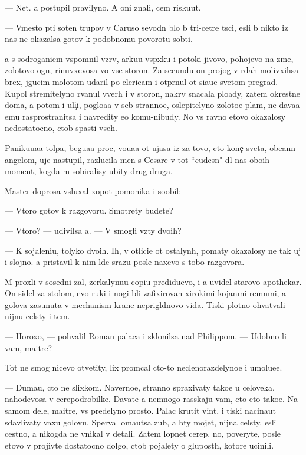 \documentclass[10pt]{book}
\begin{document}
— Net. {\Y}a postupil pravilyno. A oni znali, cem risku{\y}ut.

— Vmesto p{\ia}ti soten trupov v Caruso sevodn{\ia} b{\yi}lo b{\yi} tri-cet{\yi}re t{\yi}s{\ia}ci, {\y}esli b{\yi} nikto iz nas ne okazalsa gotov k podobnomu povorotu sob{\yi}ti{\y}.

{\Y}a s sodrogani{\y}em vspomnil vzr{\yi}v, {\y}arku{\y}u vsp{\yi}xku i potoki jivovo, pohojevo na zme{\y}, zolotovo ogn{\ia}, rinuvxevosa vo vse storon{\yi}. Za secundu on projog v r{\ia}dah molivxihsa brex, jgucim molotom udaril po clericam i otpr{\ia}nul ot si{\y}a{\y}u{\x}e{\y} svetom pregrad{\yi}. Kupol stremitelyno rvanul vverh i v storon{\yi}, nakr{\yi}v snacala plo{\x}ady, zatem okrestn{\yi}{\y}e doma, a potom i uli{\c}i, poglo{\x}a{\y}a v seb{\ia} stranno{\y}e, oslepitelyno-zoloto{\y}e plam{\ia}, ne dava{\y}a {\y}emu rasprostranitsa i navredity {\y}e{\x}o komu-nibudy. No vs{\e} ravno etovo okazalosy nedostatocno, ctob{\yi} spasti vseh.

Paniku{\y}u{\x}a{\y}a tolpa, begu{\x}a{\y}a proc, vo{\y}u{\x}a{\y}a ot ujasa iz-za tovo, cto kone{\c} sveta, obe{\x}ann{\yi}{\y} angelom, uje nastupil, razlucila men{\ia} s Cesare v tot ``cudesn{\yi}{\y}" dl{\ia} nas obo{\y}ih moment, kogda m{\yi} sobiralisy ubity drug druga.

Master doprosa v{\yi}sluxal xopot pomo{\x}nika i soob{\x}il:

— Vtoro{\y} gotov k razgovoru. Smotrety budete?

— Vtoro{\y}? — udivilsa {\y}a. — V{\yi} smogli vz{\ia}ty dvo{\y}ih?

— K sojaleni{\y}u, tolyko dvo{\y}ih. Ih, v otlici{\y}e ot ostalyn{\yi}h, po{\y}maty okazalosy ne tak uj i slojno. {\Y}a pristavil k nim l{\io}de{\y} srazu posle naxevo s tobo{\y} razgovora.

M{\yi} proxli v sosedni{\y} zal, zerkalynu{\y}u copi{\y}u predidu{\x}evo, i {\y}a uvidel starovo apothekar{\ia}. On sidel za stolom, {\y}evo ruki i nogi b{\yi}li zafixirovan{\yi} xirokimi kojan{\yi}mi remn{\ia}mi, a golova zasunuta v mechanism kra{\y}ne neprigl{\ia}dnovo vida. Tiski plotno ohvat{\yi}vali nijn{\io}{\y}u cel{\io}sty i tem{\ia}.

— Horoxo, — pohvalil Roman palaca i sklonilsa nad Philippom. — Udobno li vam, maitre?

Tot ne smog nicevo otvetity, lix prom{\yi}cal cto-to neclenorazdelyno{\y}e i umol{\ia}{\y}u{\x}e{\y}e.

— Duma{\y}u, cto ne slixkom. Naverno{\y}e, stranno spraxivaty tako{\y}e u celoveka, nahod{\ia}{\x}evosa v cerepodrobilke. Dava{\y}te {\y}a nemnogo rasskaju vam, cto eto tako{\y}e. Na samom dele, maitre, vs{\e} predelyno prosto. Palac krutit vint, i tiski nacina{\y}ut sdavlivaty vaxu golovu. Sperva loma{\y}utsa zub{\yi}, a b{\yi}ty mojet, nijn{\ia}{\y}a cel{\io}sty. {\Y}esli cestno, {\y}a nikogda ne vnikal v detali. Zatem lopnet cerep, no, poveryte, posle etovo v{\yi} projiv{\e}te dostatocno dolgo, ctob{\yi} pojalety o glupost{\ia}h, kotor{\yi}{\y}e ucinili.
\end{document}
